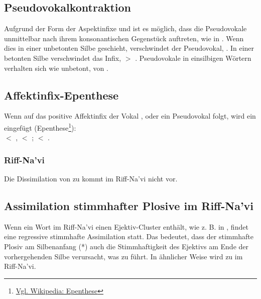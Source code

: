 \subsection{Pseudovokalkontraktion} Aufgrund der Form der Aspektinfixe  und  ist es möglich, dass die Pseudovokale unmittelbar nach ihrem konsonantischen Gegenstück auftreten, wie in . Wenn dies in einer unbetonten Silbe geschieht, verschwindet der Pseudovokal, . In einer betonten Silbe verschwindet das Infix,  $>$ . Pseudovokale in einsilbigen Wörtern verhalten sich wie unbetont,  von . 

\subsection{Affektinfix-Epenthese} Wenn auf das positive Affektinfix  der Vokal ,  oder ein Pseudovokal folgt, wird ein  eingefügt (Epenthese\footnote{\href{https://de.wikipedia.org/wiki/Epenthese}{Vgl. Wikipedia: Epenthese}}):\\  $<$ ,  $<$ ;  $<$ .
\label{lands:eiy-epenth}

\subsubsection{Riff-Na'vi} 
Die Dissimilation von  zu  kommt im Riff-Na'vi nicht vor.


\subsection{Assimilation stimmhafter Plosive im Riff-Na'vi} 
Wenn ein Wort im Riff-Na'vi einen Ejektiv-Cluster enthält, wie z. B. in  , findet eine regressive stimmhafte Assimilation statt.
Das bedeutet, dass der stimmhafte Plosiv am Silbenanfang (*) auch die Stimmhaftigkeit des  Ejektivs am Ende der vorhergehenden Silbe verursacht, was zu  führt.
In ähnlicher Weise wird   zu  im Riff-Na'vi.

